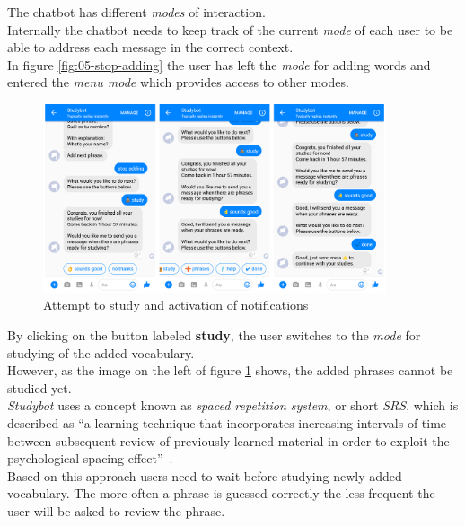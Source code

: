 The chatbot has different \emph{modes} of interaction.
\\
Internally the chatbot needs to keep track of the current \emph{mode} of each user to be able
to address each message in the correct context.
\\
In figure \ref{fig:05-stop-adding} the user has left the \emph{mode} for adding words
and entered the \emph{menu mode} which provides access to other modes.
\\

\begin{figure}[h]
  \centering
  \includegraphics[width=0.9\textwidth]{images/interface/06-enable-notify.png}
	\caption{Attempt to study and activation of notifications}
	\label{fig:06-enable-notify}
\end{figure}

By clicking on the button labeled \textbf{study},
the user switches to the \emph{mode} for studying of the added vocabulary.
\\
However, as the image on the left of figure \ref{fig:06-enable-notify} shows,
the added phrases cannot be studied yet.
\\

\emph{Studybot} uses a concept known as \emph{spaced repetition system}, or short \emph{SRS},
which is described as ``a learning technique that incorporates increasing intervals of time between subsequent review of previously learned material in order to exploit the psychological spacing effect''~\cite{srs}.
\\
Based on this approach users need to wait before studying newly added vocabulary.
The more often a phrase is guessed correctly the less frequent the user will be asked to review the phrase.
\\

